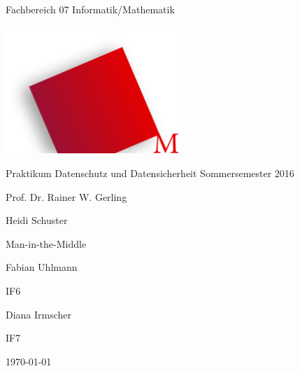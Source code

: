 \documentclass[10pt, a4paper]{scrreprt}
\begin{document}
	
	
	
	\begin{titlepage}
		\centering
		{\sffamily\huge Fachbereich 07 Informatik/Mathematik \par}
		\includegraphics[width=0.5\textwidth]{Hochschule_Muenchen_Logo.png}\par
		\vspace{1cm}
		{\sffamily\LARGE Praktikum Datenschutz und Datensicherheit Sommersemester 2016\par}
		\vspace{1cm}
		{\sffamily\Large Prof. Dr. Rainer W. Gerling\par}
		{\sffamily\Large Heidi Schuster\par}
		\vspace{2cm}
		{\LARGE Man-in-the-Middle\par}
		\vspace{1.5cm}
		{\LARGE Fabian Uhlmann\par}
		{\LARGE IF6\par}
		\vspace{0.5cm}
		{\LARGE Diana Irmscher\par}
		{\LARGE IF7\par}
		\vspace{1cm}
		{\large \today\par}
		\vfill
	\end{titlepage}

	\tableofcontents
	
\end{document}
